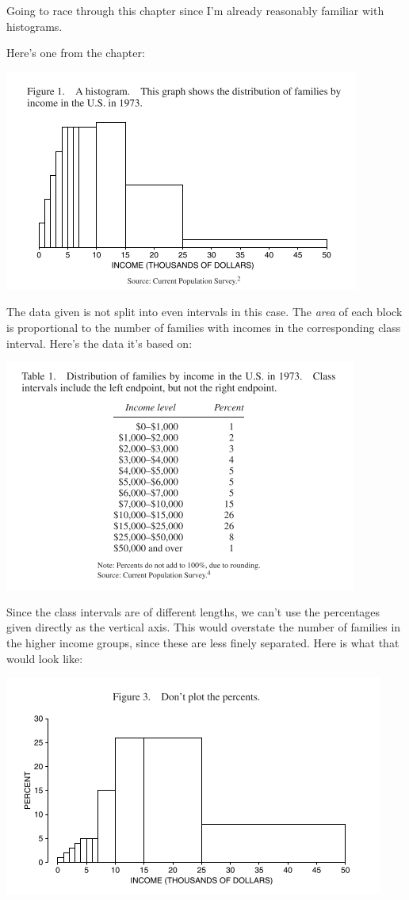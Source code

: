 \documentclass[
]{book}
\begin{document}
Going to race through this chapter since I'm already reasonably familiar with histograms.

Here's one from the chapter:

\includegraphics{images/Ch03Img01.png}

The data given is not split into even intervals in this case. The \emph{area} of each block is proportional to the number of families with incomes in the corresponding class interval. Here's the data it's based on:

\includegraphics{images/Ch03Img02.png}

Since the class intervals are of different lengths, we can't use the percentages given directly as the vertical axis. This would overstate the number of families in the higher income groups, since these are less finely separated. Here is what that would look like:

\includegraphics{images/Ch03Img03.png}
\end{document}

